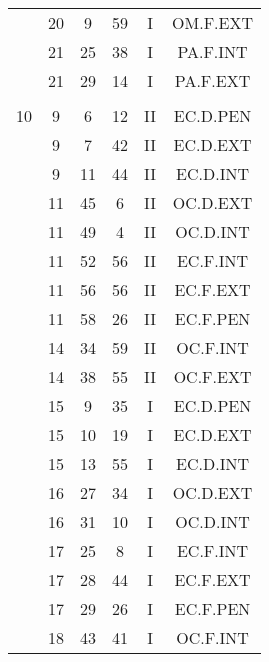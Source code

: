 \documentclass[12pt, a4paper]{article}
\begin{document}
\begin{multicols}{3}
{\begin{tabular}{c c c c c c}
	 	 	 	 & 20 & 9 & 59 & I & OM.F.EXT\\%
	 	 	 	 & 21 & 25 & 38 & I & PA.F.INT\\%
	 	 	 	 & 21 & 29 & 14 & I & PA.F.EXT\\%
	 	 	 	 & & & & & \\%
	 	 	 	10 & 9 & 6 & 12 & II & EC.D.PEN\\%
	 	 	 	 & 9 & 7 & 42 & II & EC.D.EXT\\%
	 	 	 	 & 9 & 11 & 44 & II & EC.D.INT\\%
	 	 	 	 & 11 & 45 & 6 & II & OC.D.EXT\\%
	 	 	 	 & 11 & 49 & 4 & II & OC.D.INT\\%
	 	 	 	 & 11 & 52 & 56 & II & EC.F.INT\\%
	 	 	 	 & 11 & 56 & 56 & II & EC.F.EXT\\%
	 	 	 	 & 11 & 58 & 26 & II & EC.F.PEN\\%
	 	 	 	 & 14 & 34 & 59 & II & OC.F.INT\\%
	 	 	 	 & 14 & 38 & 55 & II & OC.F.EXT\\%
	 	 	 	 & 15 & 9 & 35 & I & EC.D.PEN\\%
	 	 	 	 & 15 & 10 & 19 & I & EC.D.EXT\\%
	 	 	 	 & 15 & 13 & 55 & I & EC.D.INT\\%
	 	 	 	 & 16 & 27 & 34 & I & OC.D.EXT\\%
	 	 	 	 & 16 & 31 & 10 & I & OC.D.INT\\%
	 	 	 	 & 17 & 25 & 8 & I & EC.F.INT\\%
	 	 	 	 & 17 & 28 & 44 & I & EC.F.EXT\\%
	 	 	 	 & 17 & 29 & 26 & I & EC.F.PEN\\%
	 	 	 	 & 18 & 43 & 41 & I & OC.F.INT\\%

\end{tabular}}
\end{multicols}
\end{document}
